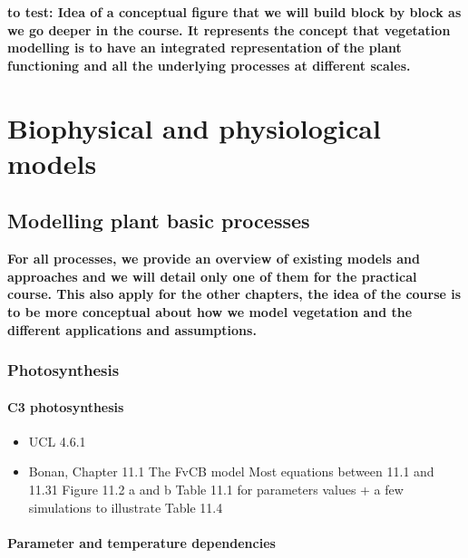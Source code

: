 \documentclass[
  oneside]{book}
\providecommand{\tightlist}{%
  \setlength{\itemsep}{0pt}\setlength{\parskip}{0pt}}
\begin{document}
\textbf{to test: Idea of a conceptual figure that we will build block by block as we go deeper in the course. It represents the concept that vegetation modelling is to have an integrated representation of the plant functioning and all the underlying processes at different scales. }

\hypertarget{part-biophysical-and-physiological-models}{%
\part{Biophysical and physiological models}\label{part-biophysical-and-physiological-models}}

\hypertarget{modelling-plant-basic-processes}{%
\chapter{Modelling plant basic processes}\label{modelling-plant-basic-processes}}


\textbf{For all processes, we provide an overview of existing models and approaches and we will detail only one of them for the practical course. This also apply for the other chapters, the idea of the course is to be more conceptual about how we model vegetation and the different applications and assumptions.}

\hypertarget{photosynthesis}{%
\section{Photosynthesis}\label{photosynthesis}}

\hypertarget{c3-photosynthesis}{%
\subsection{C3 photosynthesis}\label{c3-photosynthesis}}

\begin{itemize}
\tightlist
\item
  UCL 4.6.1
\item
  Bonan, Chapter 11.1
  The FvCB model
  Most equations between 11.1 and 11.31
  Figure 11.2 a and b
  Table 11.1 for parameters values + a few simulations to illustrate
  Table 11.4
\end{itemize}

\hypertarget{parameter-and-temperature-dependencies}{%
\subsection{Parameter and temperature dependencies}\label{parameter-and-temperature-dependencies}}
\end{document}
